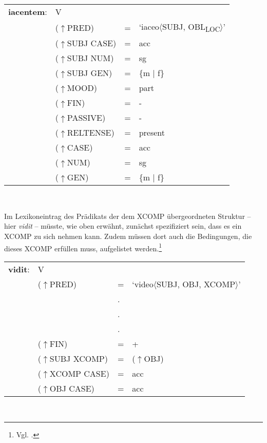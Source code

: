\documentclass[12pt,a4paper]{article}
\begin{document}
\begin{singlespace}
\begin{tabular}{ l  l  l  l  } 
\textbf{iacentem}: & \: V \\ 
$\qquad$ & \: ($\uparrow$PRED) & = & `iaceo$\langle$SUBJ, OBL\textsubscript{LOC}$\rangle$'\\
$\qquad$ & \: ($\uparrow$SUBJ CASE) & = & acc \\
$\qquad$ & \: ($\uparrow$SUBJ NUM) & = & sg \\
$\qquad$ & \: ($\uparrow$SUBJ GEN) & = & \{m $\mid$ f\} \\
$\qquad$ & \: ($\uparrow$MOOD) & = & part\\
$\qquad$ & \:  ($\uparrow$FIN) & = & - \\
$\qquad$ & \: ($\uparrow$PASSIVE) & = & - \\
$\qquad$ & \: ($\uparrow$RELTENSE) & = & present \\
$\qquad$ & \: ($\uparrow$CASE) & = & acc \\
$\qquad$ & \: ($\uparrow$NUM) & = & sg \\
$\qquad$ & \: ($\uparrow$GEN) & = & \{m $\mid$ f\} \\

\end{tabular}\\
\newline
\end{singlespace}
Im Lexikoneintrag des Prädikats der dem XCOMP übergeordneten Struktur -- hier \textit{vidit} -- müsste, wie oben erwähnt, zunächst spezifiziert sein, dass es ein XCOMP zu sich nehmen kann. Zudem müssen dort auch die Bedingungen, die dieses XCOMP erfüllen muss, aufgelistet werden.\footnote{Vgl. \cite[56]{Skript}.} \\
\begin{singlespace}
\begin{tabular}{ l  l  l  l  } 
\textbf{vidit}: & \: V \\
$\qquad$ & \: ($\uparrow$PRED) & = & `video$\langle$SUBJ, OBJ, XCOMP$\rangle$'\\
$\qquad$ & $\qquad$ & . \\
$\qquad$ & $\qquad$ & . \\
$\qquad$ & $\qquad$ & . \\
$\qquad$ & \:  ($\uparrow$FIN) & = & + \\
$\qquad$ & \:  ($\uparrow$SUBJ XCOMP) & = & ($\uparrow$OBJ)\\
$\qquad$ & \: ($\uparrow$XCOMP CASE) & = & acc \\
$\qquad$ & \: ($\uparrow$OBJ CASE) & = & acc \\
\end{tabular}\\
\newline
\newline
\end{singlespace}
\end{document}
